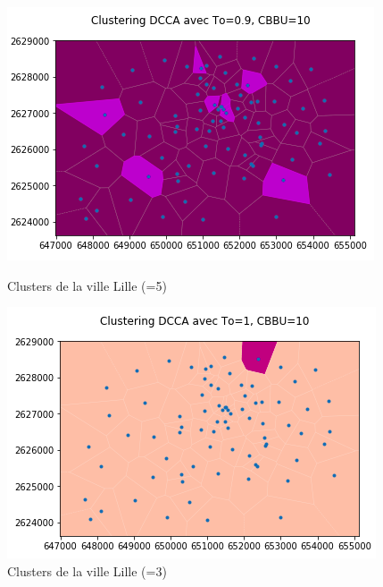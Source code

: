 \documentclass{report}
\begin{document}
\begin{figure}[H]
  \begin{minipage}{0.4\textwidth}
    \centering
    \includegraphics[scale=0.55]{images/To09.png}
    \caption{Clusters de la ville Lille (=5)}\label{Fig:Data1}
  \end{minipage}\hfill
  \begin{minipage}{0.4\textwidth}
    \centering
    \includegraphics[scale=0.55]{images/To1.png}
    \caption{Clusters de la ville Lille (=3)}\label{Fig:Data2}
  \end{minipage}
\end{figure}
\end{document}
